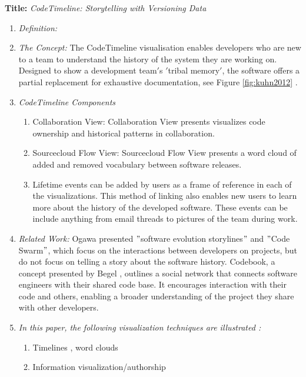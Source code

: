\documentclass{egpubl}
\begin{document}
\textbf{Title:} \textit{CodeTimeline: Storytelling with Versioning Data}
\begin{enumerate}
\item \textit{Definition:} 
\item \textit{The Concept:} The CodeTimeline visualisation enables developers who are new to a team to understand the history of the system they are working on.  Designed to show a development team$'$s $'$tribal memory$'$, the software offers a partial replacement for exhaustive documentation, see Figure \ref{fig:kuhn2012} \cite{kuhn2012}.
\item \textit{CodeTimeline Components}
\begin{enumerate}
\item Collaboration View: Collaboration View presents visualizes code ownership and historical patterns in collaboration. 

\item Sourcecloud Flow View: Sourcecloud Flow View presents a word cloud of added and removed vocabulary between software releases. 

\item Lifetime events can be added by users as a frame of reference in each of the visualizations. This method of linking also enables new users to learn more about the history of the developed software. These events can be include anything from email threads to pictures of the team during work.

\end{enumerate}

\item \textit{Related Work:} Ogawa \cite{Ogawa,ogawa2009} presented $"$software evolution storylines$"$ and $"$Code Swarm$"$, which focus on the interactions between developers on projects, but do not focus on telling a story about the software history. Codebook, a concept presented by Begel \cite{begel2010}, outlines a social network that connects software engineers with their shared code base. It encourages interaction with their code and others, enabling a broader understanding of the project they share with other developers.
\item \textit{In this paper, the following visualization techniques are illustrated :} 
\begin{enumerate}
\item Timelines , word clouds
\item Information visualization/authorship
\end{enumerate}
\end{enumerate}
\end{document}
